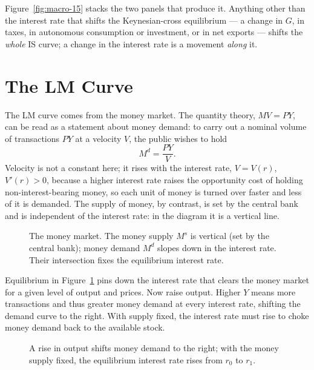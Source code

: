 
Figure~\ref{fig:macro-15} stacks the two panels that produce it. Anything other than the interest rate that shifts the Keynesian-cross equilibrium --- a change in $G$, in taxes, in autonomous consumption or investment, or in net exports --- shifts the \emph{whole} IS curve; a change in the interest rate is a movement \emph{along} it.

\section{The LM Curve}

The LM curve comes from the money market. The quantity theory, $MV = PY$, can be read as a statement about money demand: to carry out a nominal volume of transactions $PY$ at a velocity $V$, the public wishes to hold
\[
M^{d} = \frac{PY}{V}.
\]
Velocity is not a constant here; it rises with the interest rate, $V=V(r)$, $V'(r)>0$, because a higher interest rate raises the opportunity cost of holding non-interest-bearing money, so each unit of money is turned over faster and less of it is demanded. The supply of money, by contrast, is set by the central bank and is independent of the interest rate: in the diagram it is a vertical line.

\begin{figure}[h]
\centering

\caption{The money market. The money supply $M^{s}$ is vertical (set by the central bank); money demand $M^{d}$ slopes down in the interest rate. Their intersection fixes the equilibrium interest rate.}
\label{fig:macro-16}
\end{figure}

Equilibrium in Figure~\ref{fig:macro-16} pins down the interest rate that clears the money market for a given level of output and prices. Now raise output. Higher $Y$ means more transactions and thus greater money demand at every interest rate, shifting the demand curve to the right. With supply fixed, the interest rate must rise to choke money demand back to the available stock.

\begin{figure}[h]
\centering

\caption{A rise in output shifts money demand to the right; with the money supply fixed, the equilibrium interest rate rises from $r_0$ to $r_1$.}
\label{fig:macro-17}
\end{figure}

